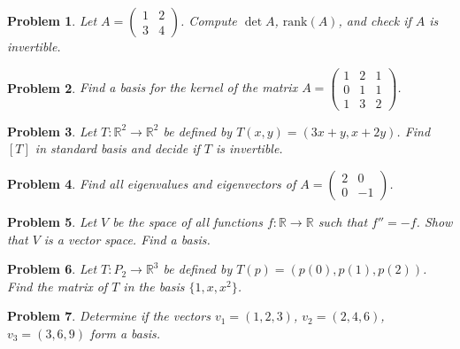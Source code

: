 \documentclass[11pt]{article}
\theoremstyle{upright}
\newtheorem{problem}{Problem}
\begin{document}
\begin{problem}
Let $A = \begin{pmatrix}1 & 2 \\ 3 & 4\end{pmatrix}$. Compute $\det A$, $\mathrm{rank}(A)$, and check if $A$ is invertible.
\end{problem}

\begin{problem}
Find a basis for the kernel of the matrix $A = \begin{pmatrix}1 & 2 & 1 \\ 0 & 1 & 1 \\ 1 & 3 & 2\end{pmatrix}$.
\end{problem}

\begin{problem}
Let $T: \mathbb{R}^2 \to \mathbb{R}^2$ be defined by $T(x, y) = (3x + y, x + 2y)$. Find $[T]$ in standard basis and decide if $T$ is invertible.
\end{problem}

\begin{problem}
Find all eigenvalues and eigenvectors of $A = \begin{pmatrix}2 & 0 \\ 0 & -1\end{pmatrix}$.
\end{problem}

\begin{problem}
Let $V$ be the space of all functions $f:\mathbb{R}\to\mathbb{R}$ such that $f'' = -f$. Show that $V$ is a vector space. Find a basis.
\end{problem}

\begin{problem}
Let $T: P_2 \to \mathbb{R}^3$ be defined by $T(p) = (p(0), p(1), p(2))$. Find the matrix of $T$ in the basis $\{1, x, x^2\}$.
\end{problem}

\begin{problem}
Determine if the vectors $v_1 = (1,2,3)$, $v_2 = (2,4,6)$, $v_3 = (3,6,9)$ form a basis.
\end{problem}
\end{document}
